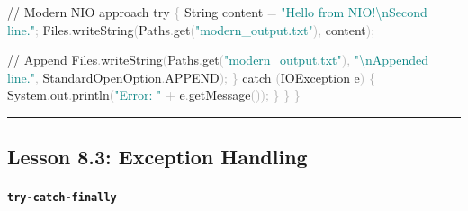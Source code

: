 \documentclass[
  justified,
  openright,
]{tufte-book}
\let\subsubsection\paragraph
\let\paragraph\paragraph
\newcommand{\BuiltInTok}[1]{#1}
\newcommand{\CommentTok}[1]{\textcolor{MidGray}{#1}}
\newcommand{\ControlFlowTok}[1]{\textcolor{BrandBlue}{#1}}
\newcommand{\FunctionTok}[1]{\textcolor{BrandBlue}{#1}}
\newcommand{\NormalTok}[1]{#1}
\newcommand{\OperatorTok}[1]{\textcolor{DarkGray}{#1}}
\newcommand{\SpecialCharTok}[1]{\textcolor{Teal}{#1}}
\newcommand{\StringTok}[1]{\textcolor{Teal}{#1}}
\newenvironment{Shaded}{%
  \begin{snugshade}
}{%
  \end{snugshade}
}
\let\subsubsection\paragraph
\let\paragraph\paragraph
\begin{document}
\begin{Shaded}
\begin{Highlighting}[]
        \CommentTok{// Modern NIO approach}
        \ControlFlowTok{try} \OperatorTok{\{}
            \BuiltInTok{String}\NormalTok{ content }\OperatorTok{=} \StringTok{"Hello from NIO!}\SpecialCharTok{\textbackslash{}n}\StringTok{Second line."}\OperatorTok{;}
\NormalTok{            Files}\OperatorTok{.}\FunctionTok{writeString}\OperatorTok{(}\NormalTok{Paths}\OperatorTok{.}\FunctionTok{get}\OperatorTok{(}\StringTok{"modern\_output.txt"}\OperatorTok{),}\NormalTok{ content}\OperatorTok{);}

            \CommentTok{// Append}
\NormalTok{            Files}\OperatorTok{.}\FunctionTok{writeString}\OperatorTok{(}\NormalTok{Paths}\OperatorTok{.}\FunctionTok{get}\OperatorTok{(}\StringTok{"modern\_output.txt"}\OperatorTok{),}
                \StringTok{"}\SpecialCharTok{\textbackslash{}n}\StringTok{Appended line."}\OperatorTok{,}
\NormalTok{                StandardOpenOption}\OperatorTok{.}\FunctionTok{APPEND}\OperatorTok{);}
        \OperatorTok{\}} \ControlFlowTok{catch} \OperatorTok{(}\BuiltInTok{IOException}\NormalTok{ e}\OperatorTok{)} \OperatorTok{\{}
            \BuiltInTok{System}\OperatorTok{.}\FunctionTok{out}\OperatorTok{.}\FunctionTok{println}\OperatorTok{(}\StringTok{"Error: "} \OperatorTok{+}\NormalTok{ e}\OperatorTok{.}\FunctionTok{getMessage}\OperatorTok{());}
        \OperatorTok{\}}
    \OperatorTok{\}}
\OperatorTok{\}}
\end{Highlighting}
\end{Shaded}

\begin{center}\rule{0.5\linewidth}{0.5pt}\end{center}

\subsection{Lesson 8.3: Exception
Handling}\label{lesson-8.3-exception-handling}

\subsubsection{\texorpdfstring{\texttt{try-catch-finally}}{try-catch-finally}}\label{try-catch-finally}
\end{document}
